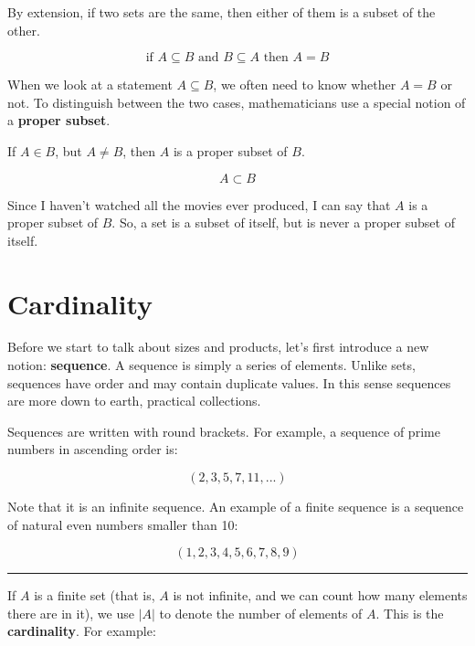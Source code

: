 \documentclass[12pt, a4paper, justified, notitlepage, sfsidenotes, notoc]{book}
\begin{document}
By extension, if two sets are the same, then either of them is a subset of the other.

\begin{equation}
\textrm{if } A \subseteq B \textrm{ and } B \subseteq A \textrm{ then } A = B
\end{equation}

When we look at a statement \(A \subseteq B\), we often need to know whether \(A = B\) or not. To distinguish between the two cases, mathematicians use a special notion of a \textbf{proper subset}.

If \(A \in B\), but \(A \neq B\), then \(A\) is a proper subset of \(B\).

\begin{equation}
A \subset B
\end{equation}

Since I haven't watched all the movies ever produced, I can say that \(A\) is a proper subset of \(B\). So, a set is a subset of itself, but is never a proper subset of itself.

\section{Cardinality}
\label{sec:orgc592b33}

Before we start to talk about sizes and products, let's first introduce a new notion:  \textbf{\textbf{sequence}}. A sequence is simply a series of elements. Unlike sets, sequences have order and may contain duplicate values. In this sense sequences are more down to earth, practical collections.

Sequences are written with round brackets. For example, a sequence of prime numbers in ascending order is:

\begin{equation}
(2, 3, 5, 7, 11, ...)
\end{equation}

Note that it is an infinite sequence. An example of a finite sequence is a sequence of natural even numbers smaller than 10:

\begin{equation}
(1, 2, 3, 4, 5, 6, 7, 8, 9)
\end{equation}

\noindent\rule{\textwidth}{0.5pt}

If \(A\) is a finite set (that is, \(A\) is not infinite, and we can count how many elements there are in it), we use \(|A|\) to denote the number of elements of \(A\). This is the \textbf{\textbf{cardinality}}. For example:
\end{document}
